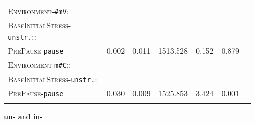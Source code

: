 \begin{table}
{\begin{tabular} {lrrrrrr}
		\textsc{Environment}-\texttt{\#mV}:&&&&&\\
		\textsc{BaseInitialStress}-\texttt{unstr.}::&&&&&\\
		\textsc{PrePause}-\texttt{pause} & \color{lsLightGray}0.002 & \color{lsLightGray}0.011 & \color{lsLightGray}1513.528 & \color{lsLightGray}0.152 &\color{lsLightGray}0.879 \\ 
		\textsc{Environment}-\texttt{m\#C}::&&&&&\\
		\textsc{BaseInitialStress}-\texttt{unstr.}:&&&&&\\
		\textsc{PrePause}-\texttt{pause }& 0.030 & 0.009 & 1525.853 & 3.424 & 0.001 \\ 
		\lspbottomrule 
			\end{tabular}
}


\end{table}
\clearpage

\textbf{{un-} and in-}


